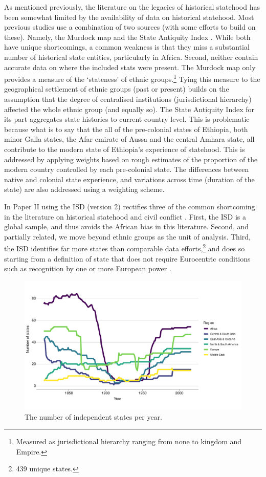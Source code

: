 As mentioned previously, the literature on the legacies of historical statehood
has been somewhat limited by the availability of data on historical statehood.
Most previous studies use a combination of two sources (with some efforts to
build on these). Namely, the Murdock map \citep{Murdock1967} and the State
Antiquity Index \citep{Bockstette2012}. While both have unique shortcomings, a
common weakness is that they miss a substantial number of historical state
entities, particularly in Africa. Second, neither contain accurate data on where
the included stats were present. The Murdock map \citep{Murdock1967} only
provides a measure of the `stateness' of ethnic groups.\footnote{Measured as
jurisdictional hierarchy ranging from none to kingdom and Empire.} Tying this
measure to the geographical settlement of ethnic groups (past or present) builds
on the assumption that the degree of centralised institutions (jurisdictional
hierarchy) affected the whole ethnic group (and equally so). The State Antiquity
Index for its part aggregates state histories to current country level. This is
problematic because what is to say that the all of the pre-colonial states of
Ethiopia, both minor Galla states, the Afar emirate of Aussa and the central
Amhara state, all contribute to the modern state of Ethiopia's experience of
statehood. This is addressed by applying weights based on rough estimates of the
proportion of the modern country controlled by each pre-colonial state. The
differences between native and colonial state experience, and variations across
time (duration of the state) are also addressed using a weighting scheme.

In Paper II using the ISD (version 2) rectifies three of the common shortcoming
in the literature on historical statehood and civil conflict
\citep{Griffiths2013}. First, the ISD is a global sample, and thus avoids the
African bias in this literature. Second, and partially related, we move beyond
ethnic groups as the unit of analysis. Third, the ISD identifies far more states
than comparable data efforts,\footnote{439 unique states.} and does so starting
from a definition of state that does not require Eurocentric conditions such as
recognition by one or more European power \citep{Griffiths2013}. 

\begin{figure}[hpbt]
	\centering
	\includegraphics[width=\textwidth]{../R/Output/statesPerYear.pdf}
	\caption{The number of independent states per year.}
	\label{statesperyear}
\end{figure}

